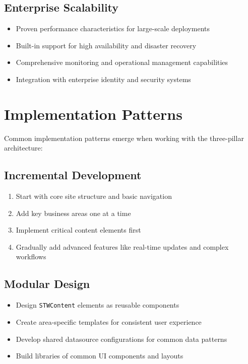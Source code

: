 \subsection{Enterprise Scalability}

\begin{itemize}
	\item Proven performance characteristics for large-scale deployments
	\item Built-in support for high availability and disaster recovery
	\item Comprehensive monitoring and operational management capabilities
	\item Integration with enterprise identity and security systems
\end{itemize}

\section{Implementation Patterns}
\label{sec:implementation-patterns}

Common implementation patterns emerge when working with the three-pillar architecture:

\subsection{Incremental Development}

\begin{enumerate}
	\item Start with core site structure and basic navigation
	\item Add key business areas one at a time
	\item Implement critical content elements first
	\item Gradually add advanced features like real-time updates and complex workflows
\end{enumerate}

\subsection{Modular Design}

\begin{itemize}
	\item Design \texttt{STWContent} elements as reusable components
	\item Create area-specific templates for consistent user experience
	\item Develop shared datasource configurations for common data patterns
	\item Build libraries of common UI components and layouts
\end{itemize}

